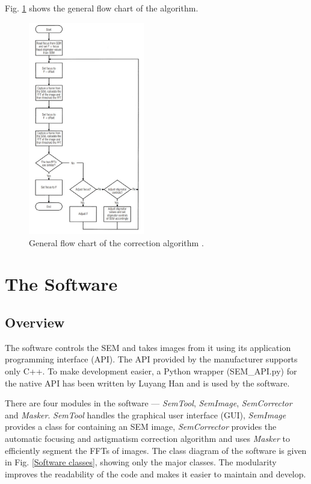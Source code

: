\documentclass[conference]{IEEEtran}
\begin{document}
Fig. \ref{Correction algorithm flowchart} shows the general flow chart of the algorithm.

\begin{figure}[htbp]
    \centering
    \includegraphics[width=0.45\textwidth]{Images/Correction algorithm flowchart.jpg}
    \caption{General flow chart of the correction algorithm \cite{SEM astigmatation correction algorithm}.}
    \label{Correction algorithm flowchart}
\end{figure}

\section{The Software}
\subsection{Overview}
The software controls the SEM and takes images from it using its application programming interface (API). The API provided by the manufacturer supports only C++. To make development easier, a Python wrapper (SEM\_API.py) for the native API has been written by Luyang Han and is used by the software.

There are four modules in the software --- \textit{SemTool}, \textit{SemImage}, \textit{SemCorrector} and \textit{Masker}. \textit{SemTool} handles the graphical user interface (GUI), \textit{SemImage} provides a class for containing an SEM image, \textit{SemCorrector} provides the automatic focusing and astigmatism correction algorithm and uses \textit{Masker} to efficiently segment the FFTs of images. The class diagram of the software is given in Fig. \ref{Software classes}, showing only the major classes. The modularity improves the readability of the code and makes it easier to maintain and develop.
\end{document}
